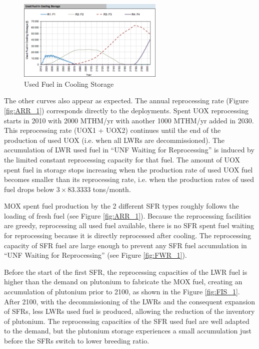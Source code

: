 \documentclass[12pt]{article}
\begin{document}
\begin{figure}[h!]
    \centering
    \includegraphics[width=0.62\textwidth]{img/usedFuelInCooling}
    \caption{Used Fuel in Cooling Storage}
    \label{fig:UFCS_1}
\end{figure}

The other curves also appear as expected. The annual reprocessing rate (Figure
\ref{fig:ARR_1}) corresponds directly to the deployments. Spent UOX
reprocessing starts in 2010 with 2000 MTHM/yr with another 1000 MTHM/yr added in
2030. This reprocessing rate (UOX1 + UOX2) continues until the end of the
production of used UOX (i.e. when all LWRs are decommissioned).
The accumulation of LWR used fuel in ``UNF Waiting for Reprocessing'' is induced
by the limited constant reprocessing capacity for that fuel. The amount of UOX
spent fuel in storage stops increasing when the production rate of used UOX fuel
becomes smaller than its reprocessing rate, i.e. when the production rates of used
fuel drops below $3\times83.3333$ tons/month.
 
MOX spent fuel production by the 2 different SFR types roughly follows the
loading of fresh fuel (see Figure \ref{fig:ARR_1}). Because the reprocessing
facilities are greedy, reprocessing all used fuel available, there is no SFR
spent fuel waiting for reprocessing because it is directly reprocessed after
cooling. The reprocessing capacity of SFR fuel are large enough to prevent any
SFR fuel accumulation in ``UNF Waiting for Reprocessing'' (see Figure
\ref{fig:FWR_1}).

Before the start of the first SFR, the reprocessing capacities of the LWR fuel
is higher than the demand on plutonium to fabricate the MOX fuel, creating an
accumulation of plutonium prior to 2100, as shown in the Figure
\ref{fig:FIS_1}. After 2100, with the decommissioning of the LWRs and the
consequent expansion of SFRs, less LWRs used fuel is produced, allowing the
reduction of the inventory of plutonium. The reprocessing capacities of the SFR
used fuel are well adapted to the demand, but the plutonium storage experiences
a small accumulation just before the SFRs switch to lower breeding ratio.
 
\end{document}
